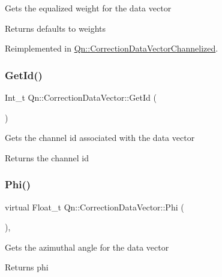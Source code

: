 Gets the equalized weight for the data vector \begin{DoxyReturn}{Returns}
defaults to weights 
\end{DoxyReturn}


Reimplemented in \mbox{\hyperlink{classQn_1_1CorrectionDataVectorChannelized_a40656c301d6db91a2e761b129d746832}{Qn\+::\+Correction\+Data\+Vector\+Channelized}}.

\mbox{\label{classQn_1_1CorrectionDataVector_a14c8e1a91eaeaff1fec89e80d715d07d}} 
\subsubsection{\texorpdfstring{Get\+Id()}{GetId()}}
{\footnotesize\ttfamily Int\+\_\+t Qn\+::\+Correction\+Data\+Vector\+::\+Get\+Id (\begin{DoxyParamCaption}{ }\end{DoxyParamCaption})\hspace{0.3cm}{\ttfamily [inline]}}

Gets the channel id associated with the data vector \begin{DoxyReturn}{Returns}
the channel id 
\end{DoxyReturn}
\mbox{\label{classQn_1_1CorrectionDataVector_a7b27c82f17e502100d8c83c642a161ec}} 
\subsubsection{\texorpdfstring{Phi()}{Phi()}}
{\footnotesize\ttfamily virtual Float\+\_\+t Qn\+::\+Correction\+Data\+Vector\+::\+Phi (\begin{DoxyParamCaption}{ }\end{DoxyParamCaption})\hspace{0.3cm}{\ttfamily [inline]}, {\ttfamily [virtual]}}

Gets the azimuthal angle for the data vector \begin{DoxyReturn}{Returns}
phi 
\end{DoxyReturn}
\mbox{\label{classQn_1_1CorrectionDataVector_a62c233a19220b9447412b6fb758a5732}} 

